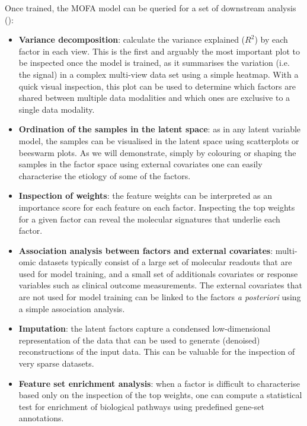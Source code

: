 Once trained, the MOFA model can be queried for a set of downstream analysis ():
\begin{itemize}
	\item \textbf{Variance decomposition}: calculate the variance explained ($R^2$) by each factor in each view. This is the first and arguably the most important plot to be inspected once the model is trained, as it summarises the variation (i.e. the signal) in a complex multi-view data set using a simple heatmap. With a quick visual inspection, this plot can be used to determine which factors are shared between multiple data modalities and which ones are exclusive to a single data modality.

	\item \textbf{Ordination of the samples in the latent space}: as in any latent variable model, the samples can be visualised in the latent space using scatterplots or beeswarm plots. As we will demonstrate, simply by colouring or shaping the samples in the factor space using external covariates one can easily characterise the etiology of some of the factors.

	\item \textbf{Inspection of weights}: the feature weights can be interpreted as an importance score for each feature on each factor. Inspecting the top weights for a given factor can reveal the molecular signatures that underlie each factor.

	\item \textbf{Association analysis between factors and external covariates}: multi-omic datasets typically consist of a large set of molecular readouts that are used for model training, and a small set of additionals covariates or response variables such as clinical outcome measurements. The external covariates that are not used for model training can be linked to the factors \textit{a posteriori} using a simple association analysis.

	\item \textbf{Imputation}: the latent factors capture a condensed low-dimensional representation of the data that can be used to generate (denoised) reconstructions of the input data. This can be valuable for the inspection of very sparse datasets.

	\item \textbf{Feature set enrichment analysis}: when a factor is difficult to characterise based only on the inspection of the top weights, one can compute a statistical test for enrichment of biological pathways using predefined gene-set annotations.

\end{itemize}

